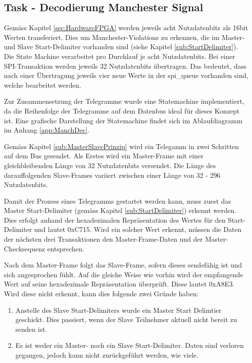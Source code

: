\subsection{Task - Decodierung Manchester Signal}
\label{sub:MvbManchDecode}
Gemäss Kapitel \ref{sec:HardwareFPGA} werden jeweils acht Nutzdatenbits als 16bit Werten transferiert. Dies um Manchester-Violations zu erkennen, die im Master- und Slave Start-Delimiter vorhanden sind (siehe Kapitel \ref{sub:StartDelimiter}). Die State Machine verarbeitet pro Durchlauf je acht Nutzdatenbits. Bei einer SPI-Transaktion werden jeweils 32 Nutzdatenbits übertragen. Das bedeutet, dass nach einer Übertragung jeweils vier neue Werte in der spi\_queue vorhanden sind, welche bearbeitet werden. 

Zur Zusammensetzung der Telegramme wurde eine Statemachine implementiert, da die Reihenfolge der Telegramme auf dem Datenbus ideal für dieses Konzept ist. Eine grafische Darstellung der Statemachine findet sich im Ablaufdiagramm im Anhang \ref{app:ManchDec}.

Gemäss Kapitel \ref{sub:MasterSlavePrinzip} wird ein Telegamm in zwei Schritten auf dem Bus gesendet. Als Erstes wird ein Master-Frame mit einer gleichbleibenden Länge von 32 Nutzdatenbits versendet. Die Länge des darauffolgenden Slave-Frames variiert zwischen einer Länge von 32 - 296 Nutzdatenbits.

Damit der Prozess eines Telegramms gestartet werden kann, muss zuest das Master Start-Delimiter (gemäss Kapitel \ref{sub:StartDelimiter}) erkennt werden. Dies erfolgt anhand der hexadezimalen Repräsentation des Wertes für den Start-Delimiter und lautet 0xC715. Wird ein solcher Wert erkennt, müssen die Daten der nächsten drei Transaktionen den Master-Frame-Daten und der Master-Checksequenz entsprechen.

Nach dem Master-Frame folgt das Slave-Frame, sofern dieses sendefähig ist und sich angesprochen fühlt. Auf die gleiche Weise wie vorhin wird der empfangende Wert auf seine hexadezimale Repräsentation überprüft. Diese lautet 0xA8E3. Wird diese nicht erkennt, kann dies folgende zwei Gründe haben:

\begin{enumerate}
    \item Anstelle des Slave Start-Delimiters wurde ein Master Start Delimtier geschickt. Dies passiert, wenn der Slave Teilnehmer aktuell nicht bereit zu senden ist. 
    \item Es ist weder ein Master- noch ein Slave Start-Delimiter. Daten sind verloren gegangen, jedoch kann nicht zurückgeführt werden, wie viele.
\end{enumerate}

